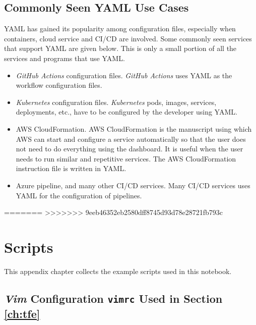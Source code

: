 \section{Commonly Seen YAML Use Cases}

YAML has gained its popularity among configuration files, especially when containers, cloud service and CI/CD are involved. Some commonly seen services that support YAML are given below. This is only a small portion of all the services and programs that use YAML.

\begin{itemize}
	\item \textit{GitHub Actions} configuration files. \textit{GitHub Actions} uses YAML as the workflow configuration files.
	\item \textit{Kubernetes} configuration files. \textit{Kubernetes} pods, images, services, deployments, etc., have to be configured by the developer using YAML.
	\item AWS CloudFormation. AWS CloudFormation is the manuscript using which AWS can start and configure a service automatically so that the user does not need to do everything using the dashboard. It is useful when the user needs to run similar and repetitive services. The AWS CloudFormation instruction file is written in YAML.
	\item Azure pipeline, and many other CI/CD services. Many CI/CD services uses YAML for the configuration of pipelines.
\end{itemize}
=======
>>>>>>> 9eeb46352eb2580dff8745d93d78e28721fb793c
\chapter{Scripts}

This appendix chapter collects the example scripts used in this notebook.

\section{\textit{Vim} Configuration \texttt{vimrc} Used in Section \ref{ch:tfe}}

